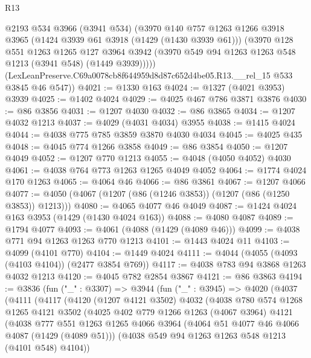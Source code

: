 \begin{lexlean}{R13}
\begin{coremodule}
        @2193
        @534
        @3966
        (@3941 @534)
        (@3970
          @140
          @757
          @1263
          @1266
          @3918
          @3965
          (@1424 @3939 @61 @3918 (@1429 (@1430 @3939 @61)))
          (@3970
            @128
            @551
            @1263
            @1265
            @127
            @3964
            @3942
            (@3970 @549 @94 @1263 @1263 @548 @1213 (@3941 @548) (@1449 @3939)))))
      (LexLeanPreserve.C69a0078cb8f644959d8d87c652d4be05.R13.__rel_15 @533 @3845 @46 @547))
@4021 := @1330 @163
@4024 := @1327 (@4021 @3953) @3939
@4025 := @1402 @4024
@4029 := @4025 @467 @786 @3871 @3876
@4030 := @86 @3856
@4031 := @1207 @4030
@4032 := @86 @3865
@4034 := @1207 @4032 @1213
@4037 := @4029 (@4031 @4034) @3955
@4038 := @1415 @4024
@4044 := @4038 @775 @785 @3859 @3870 @4030 @4034
@4045 := @4025 @435
@4048 := @4045 @774 @1266 @3858
@4049 := @86 @3854
@4050 := @1207 @4049
@4052 := @1207 @770 @1213
@4055 := @4048 (@4050 @4052) @4030
@4061 := @4038 @764 @773 @1263 @1265 @4049 @4052
@4064 := @1774 @4024 @170 @1263
@4065 := @4064 @46
@4066 := @86 @3861
@4067 := @1207 @4066
@4077 := @4050 (@4067 (@1207 (@86 (@1246 @3853)) (@1207 (@86 (@1250 @3853)) @1213)))
@4080 := @4065 @4077 @46 @4049
@4087 := @1424 @4024 @163 @3953 (@1429 (@1430 @4024 @163))
@4088 := @4080 @4087
@4089 := @1794 @4077
@4093 := @4061 (@4088 (@1429 (@4089 @46)))
@4099 := @4038 @771 @94 @1263 @1263 @770 @1213
@4101 := @1443 @4024 @11
@4103 := @4099 (@4101 @770)
@4104 := @1449 @4024
@4111 := @4044 (@4055 (@4093 (@4103 @4104)) (@2477 @3854 @769))
@4117 := @4038 @783 @94 @3868 @1263 @4032 @1213
@4120 := @4045 @782 @2854 @3867
@4121 := @86 @3863
@4194 := @3836
    (fun ("_" : @3307) =>
    @3944
      (fun ("_" : @3945) =>
      @4020
        (@4037
          (@4111
            (@4117
              (@4120
                (@1207 @4121 @3502)
                @4032
                (@4038
                  @780
                  @574
                  @1268
                  @1265
                  @4121
                  @3502
                  (@4025
                    @402
                    @779
                    @1266
                    @1263
                    (@4067 @3964)
                    @4121
                    (@4038
                      @777
                      @551
                      @1263
                      @1265
                      @4066
                      @3964
                      (@4064 @51 @4077 @46 @4066 @4087 (@1429 (@4089 @51)))
                      (@4038 @549 @94 @1263 @1263 @548 @1213 (@4101 @548) @4104))

\end{coremodule}
\end{lexlean}
